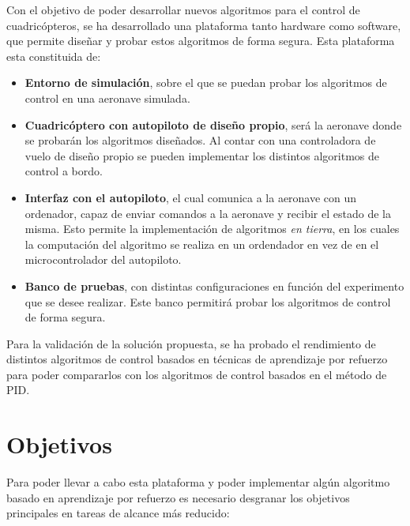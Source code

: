 Con el objetivo de poder desarrollar nuevos algoritmos para el control de cuadricópteros, se ha desarrollado una plataforma tanto hardware como software, que permite diseñar y probar estos algoritmos de forma segura. Esta plataforma esta constituida de:

\begin{itemize}
	\item \textbf{Entorno de simulación}, sobre el que se puedan probar los algoritmos de control en una aeronave simulada.
	\item \textbf{Cuadricóptero con autopiloto de diseño propio}, será la aeronave donde se probarán los algoritmos diseñados. Al contar con una controladora de vuelo de diseño propio se pueden implementar los distintos algoritmos de control a bordo.
	\item \textbf{Interfaz con el autopiloto}, el cual comunica a la aeronave con un ordenador, capaz de enviar comandos a la aeronave y recibir el estado de la misma. Esto permite la implementación de algoritmos \textit{en tierra}, en los cuales la computación del algoritmo se realiza en un ordendador en vez de en el microcontrolador del autopiloto. 
	\item \textbf{Banco de pruebas}, con distintas configuraciones en función del experimento que se desee realizar. Este banco permitirá probar los algoritmos de control de forma segura.
	
\end{itemize}


 Para la validación de la solución propuesta, se ha probado el rendimiento de distintos algoritmos de control basados en técnicas de aprendizaje por refuerzo para poder compararlos con los algoritmos de control basados en el método de PID.
 
 \section{Objetivos}
 Para poder llevar a cabo esta plataforma y poder implementar algún algoritmo basado en aprendizaje por refuerzo es necesario desgranar los objetivos principales en tareas de alcance más reducido:
 

